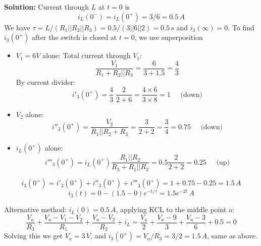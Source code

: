 \begin{enumerate}
  {\bf Solution:} Current through $L$ at $t=0$ is
  \[
  i_L(0^-)=i_L(0^+)=3/6=0.5\,A
  \]
  We have $\tau=L/(R_1||R_2||R_3)=0.5/(3||6||2)=0.5\,s$ and $i_3(\infty)=0$.
  To find $i_3(0^+)$ after the switch is closed at $t=0$, we use 
  superposition
  \begin{itemize}
  \item $V_1=6V$ alone: Total current through $V_1$:
    \[
    \frac{V_1}{R_1+R_2||R_3}=\frac{6}{3+1.5}=\frac{4}{3}
    \]
    By current divider:
    \[
    i'_3(0^+)=\frac{4}{3}\;\frac{2}{2+6}=\frac{4\times 6}{3\times 8}=1\;\;\;\;\;\mbox{(down)}
    \]
  \item $V_2$ alone: 
    \[
    i''_3(0^+)=\frac{V_2}{R_1||R_2+R_3}=\frac{3}{2+2}=\frac{3}{4}=0.75\;\;\;\;\;\mbox{(down)}
    \]
  \item $i_L(0^+)$ alone:
    \[
    i'''_3(0^+)=i_L(0^+)\frac{R_1||R_2}{R_3+R_1||R_2}=0.5\frac{2}{2+2}=0.25\;\;\;\;\;\mbox{(up)}
    \]
  \end{itemize}
  \[
  i_3(0^+)=i'_3(0^+)+i''_3(0^+)+i'''_3(0^+)=1+0.75-0.25=1.5\,A
  \]
  \[
  i_3(t)=0-(1.5-0)e^{-t/\tau}=1.5e^{-2t}\,A
  \]

  Alternative method: $i_L(0)=0.5\,A$, applying KCL to the middle point a:
  \[
  \frac{V_a}{R_3}+\frac{V_a-V_1-V_2}{R_1}+\frac{V_a-V_2}{R_2}+i_L
  =\frac{V_a}{2}+\frac{V_a-9}{3}+\frac{V_a-3}{6}+0.5=0
  \]
  Solving this we get $V_a=3\,V$, and $i_3(0^+)=V_a/R_3=3/2=1.5\,A$, same
  as above.

\end{enumerate}


